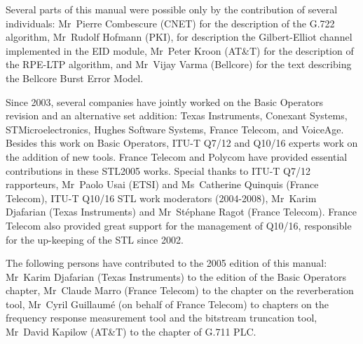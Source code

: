 Several parts of this manual were possible only by the contribution of
several individuals: Mr~Pierre Combescure (CNET) for the description
of the G.722 algorithm, Mr~Rudolf Hofmann (PKI), for description the
Gilbert-Elliot channel implemented in the EID module, Mr~Peter Kroon
(AT\&T) for the description of the RPE-LTP algorithm, and Mr~Vijay
Varma (Bellcore) for the text describing the Bellcore Burst Error
Model.

Since 2003, several companies have jointly worked on the Basic
Operators revision and an alternative set addition: Texas Instruments,
Conexant Systems, STMicroelectronics, Hughes Software Systems, France
Telecom, and VoiceAge. Besides this work on Basic Operators, ITU-T
Q7/12 and Q10/16 experts work on the addition of new tools. France
Telecom and Polycom have provided essential contributions in these
STL2005 works. Special thanks to ITU-T Q7/12 rapporteurs, Mr~Paolo
Usai (ETSI) and Ms~Catherine Quinquis (France Telecom), ITU-T Q10/16
STL work moderators (2004-2008), Mr~Karim Djafarian (Texas
Instruments) and Mr~St\'{e}phane Ragot (France Telecom). France
Telecom also provided great support for the management of Q10/16,
responsible for the up-keeping of the STL since 2002.

The following persons have contributed to the 2005 edition of this
manual: Mr~Karim Djafarian (Texas Instruments) to the edition of the
Basic Operators chapter, Mr~Claude Marro (France Telecom) to the
chapter on the reverberation tool, Mr~Cyril Guillaum\'{e} (on behalf
of France Telecom) to chapters on the frequency response measurement
tool and the bitstream truncation tool, Mr~David Kapilow (AT\&T) to
the chapter of G.711 PLC.


